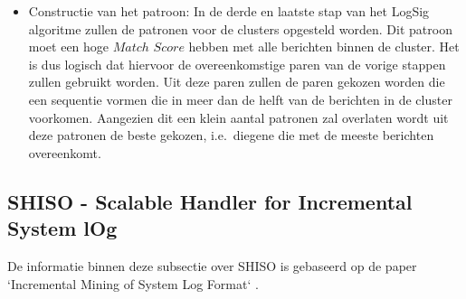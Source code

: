 \begin{itemize}
    Het lokaal zoek algoritme wordt weergegeven in figuur \ref{pic:LogSigalgoritme}. Hierbij wordt $\Phi(D)$ gemaximaliseerd, i.e.\ de totale som van de $\phi(C)$ van elke cluster die gecreëerd is. Hierbij is \(\delta_{iX_{j}} \Phi(D)\) de verandering aan $\Phi(D)$ door $X$ te verplaatsen van groep $C_{i}$ naar $C_{j}$.
    
    \begin{figure}[!htp]
        \texttt{[image: LogSig\_LokaalZoekAlgoritme.png]}
        \caption{Het LogSig lokaal zoek algoritme. Figuur overgenomen uit de paper `LogSig: Generating System Events from Raw Textual Logs` \autocite{tang2011logsig}}
        \label{pic:LogSigalgoritme}
    \end{figure}
    
    \item Constructie van het patroon: In de derde en laatste stap van het LogSig algoritme zullen de patronen voor de clusters opgesteld worden. Dit patroon moet een hoge $Match$ $Score$ hebben met alle berichten binnen de cluster. Het is dus logisch dat hiervoor de overeenkomstige paren van de vorige stappen zullen gebruikt worden. Uit deze paren zullen de paren gekozen worden die een sequentie vormen die in meer dan de helft van de berichten in de cluster voorkomen. Aangezien dit een klein aantal patronen zal overlaten wordt uit deze patronen de beste gekozen, i.e.\ diegene die met de meeste berichten overeenkomt.
\end{itemize}

\subsection{SHISO - Scalable Handler for Incremental System lOg}
De informatie binnen deze subsectie over SHISO is gebaseerd op de paper `Incremental Mining of System Log Format` \autocite{mizutani2013incremental}.

